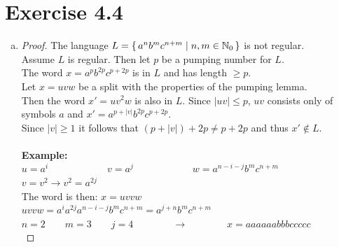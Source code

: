 \documentclass{article} %
\newcommand{\homeworkNumber}{4}
\begin{document}
\section*{Exercise \homeworkNumber.4}
\begin{enumerate}[(a)]
	\item
	\begin{proof}
	The language $L = \set{a^nb^mc^{n+m} \mid n, m \in \mathbb{N}_0}$ is not regular.\\
	Assume $L$ is regular. Then let $p$ be a pumping number for $L$.\\
	The word $x = a^pb^{2p}c^{p+2p}$ is in $L$ and has length $\ge p$.\\
	Let $x = uvw$ be a split with the properties of the pumping lemma.\\
	Then the word $x' = uv^2w$ is also in $L$. Since $|uv| \le p$, $uv$ consists only of symbols $a$
	and $x' = a^{p+|v|}b^{2p}c^{p+2p}$.\\
	Since $|v| \ge 1$ it follows that $(p + |v|) + 2p \neq p + 2p$ and thus $x' \notin L$.\\\\
	\textbf{Example:}\\
	$u = a^i \qquad \qquad \qquad v = a^j \qquad \qquad \qquad w = a^{n-i-j}b^mc^{n+m}$\\
	$v = v^2 \rightarrow v^2 = a^{2j}$\\
	The word is then: $x = uvvw$\\
	$uvvw = a^ia^{2j}a^{n-i-j}b^mc^{n+m} = a^{j+n}b^mc^{n+m}$\\
	$n = 2 \qquad m = 3 \qquad j = 4 \qquad \qquad \rightarrow \qquad \qquad x = aaaaaabbbccccc$\\
	\end{proof}

\end{enumerate}
\end{document}
